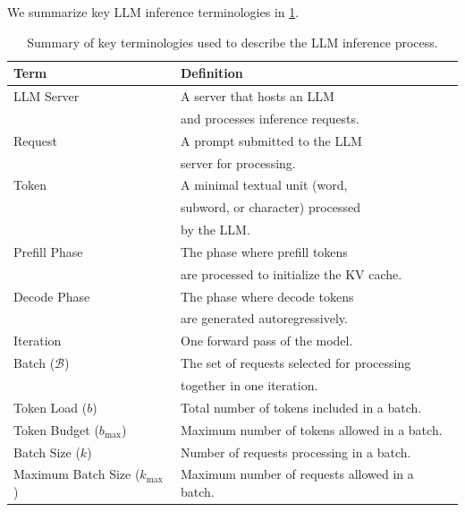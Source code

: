 \documentclass[11pt]{article}
\theoremstyle{plain}
\theoremstyle{definition}
\theoremstyle{remark}
\begin{document}
We summarize key LLM inference terminologies in \cref{tab:llm-inference-terminologies}.

\begin{table}[ht]
  \centering
  \begin{tabular}{@{}ll@{}}
      \toprule
      \textbf{Term} & \textbf{Definition} \\
      \midrule
      LLM Server & A server that hosts an LLM \\ 
      & and processes inference requests. \\
      \midrule
      Request & A prompt submitted to the LLM \\ 
      & server for processing. \\
      \midrule
      Token & A minimal textual unit (word, \\ 
      & subword, or character) processed \\ 
      & by the LLM. \\
      \midrule
      Prefill Phase & The phase where prefill tokens \\ 
      & are processed to initialize the KV cache. \\
      \midrule
      Decode Phase & The phase where decode tokens \\ 
      & are generated autoregressively. \\
      \midrule
      Iteration & One forward pass of the model. \\
      \midrule
      Batch (\(\mathcal{B}\)) & The set of requests selected for processing \\
      & together in one iteration. \\
      \midrule
      Token Load (\(b\)) & Total number of tokens included in a batch. \\
      \midrule
      Token Budget (\(b_{\max}\)) & Maximum number of tokens allowed in a batch. \\
      \midrule
      Batch Size (\(k\)) & Number of requests processing in a batch. \\
      \midrule
      Maximum Batch Size (\(k_{\max}\)) & Maximum number of requests allowed in a batch. \\
      \bottomrule
  \end{tabular}
  \caption{Summary of key terminologies used to describe the LLM inference process.}
  \label{tab:llm-inference-terminologies}
\end{table}
\end{document}
